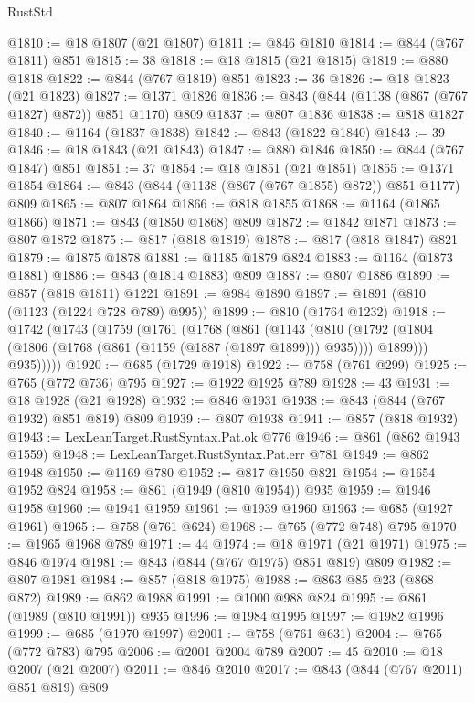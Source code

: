\begin{lexlean}{RustStd}
\begin{coremodule}
@1810 := @18 @1807 (@21 @1807)
@1811 := @846 @1810
@1814 := @844 (@767 @1811) @851
@1815 := 38
@1818 := @18 @1815 (@21 @1815)
@1819 := @880 @1818
@1822 := @844 (@767 @1819) @851
@1823 := 36
@1826 := @18 @1823 (@21 @1823)
@1827 := @1371 @1826
@1836 := @843 (@844 (@1138 (@867 (@767 @1827) @872)) @851 @1170) @809
@1837 := @807 @1836
@1838 := @818 @1827
@1840 := @1164 (@1837 @1838)
@1842 := @843 (@1822 @1840)
@1843 := 39
@1846 := @18 @1843 (@21 @1843)
@1847 := @880 @1846
@1850 := @844 (@767 @1847) @851
@1851 := 37
@1854 := @18 @1851 (@21 @1851)
@1855 := @1371 @1854
@1864 := @843 (@844 (@1138 (@867 (@767 @1855) @872)) @851 @1177) @809
@1865 := @807 @1864
@1866 := @818 @1855
@1868 := @1164 (@1865 @1866)
@1871 := @843 (@1850 @1868) @809
@1872 := @1842 @1871
@1873 := @807 @1872
@1875 := @817 (@818 @1819)
@1878 := @817 (@818 @1847) @821
@1879 := @1875 @1878
@1881 := @1185 @1879 @824
@1883 := @1164 (@1873 @1881)
@1886 := @843 (@1814 @1883) @809
@1887 := @807 @1886
@1890 := @857 (@818 @1811) @1221
@1891 := @984 @1890
@1897 := @1891 (@810 (@1123 (@1224 @728 @789) @995))
@1899 := @810 (@1764 @1232)
@1918 := @1742
    (@1743
      (@1759
        (@1761
          (@1768
            (@861
              (@1143
                (@810
                  (@1792 (@1804 (@1806 (@1768 (@861 (@1159 (@1887 (@1897 @1899))) @935)))) @1899)))
              @935)))))
@1920 := @685 (@1729 @1918)
@1922 := @758 (@761 @299)
@1925 := @765 (@772 @736) @795
@1927 := @1922 @1925 @789
@1928 := 43
@1931 := @18 @1928 (@21 @1928)
@1932 := @846 @1931
@1938 := @843 (@844 (@767 @1932) @851 @819) @809
@1939 := @807 @1938
@1941 := @857 (@818 @1932)
@1943 := LexLeanTarget.RustSyntax.Pat.ok @776
@1946 := @861 (@862 @1943 @1559)
@1948 := LexLeanTarget.RustSyntax.Pat.err @781
@1949 := @862 @1948
@1950 := @1169 @780
@1952 := @817 @1950 @821
@1954 := @1654 @1952 @824
@1958 := @861 (@1949 (@810 @1954)) @935
@1959 := @1946 @1958
@1960 := @1941 @1959
@1961 := @1939 @1960
@1963 := @685 (@1927 @1961)
@1965 := @758 (@761 @624)
@1968 := @765 (@772 @748) @795
@1970 := @1965 @1968 @789
@1971 := 44
@1974 := @18 @1971 (@21 @1971)
@1975 := @846 @1974
@1981 := @843 (@844 (@767 @1975) @851 @819) @809
@1982 := @807 @1981
@1984 := @857 (@818 @1975)
@1988 := @863 @85 @23 (@868 @872)
@1989 := @862 @1988
@1991 := @1000 @988 @824
@1995 := @861 (@1989 (@810 @1991)) @935
@1996 := @1984 @1995
@1997 := @1982 @1996
@1999 := @685 (@1970 @1997)
@2001 := @758 (@761 @631)
@2004 := @765 (@772 @783) @795
@2006 := @2001 @2004 @789
@2007 := 45
@2010 := @18 @2007 (@21 @2007)
@2011 := @846 @2010
@2017 := @843 (@844 (@767 @2011) @851 @819) @809

\end{coremodule}
\end{lexlean}
